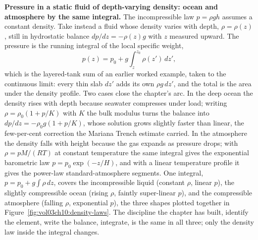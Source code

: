 \begin{mastery}
\textbf{Pressure in a static fluid of depth-varying density: ocean and
atmosphere by the same integral.} The incompressible law $p=\rho gh$
assumes a constant density. Take instead a fluid whose density varies with
depth, $\rho=\rho(z)$, still in hydrostatic balance $dp/dz=-\rho(z)g$ with
$z$ measured upward. The pressure is the running integral of the local
specific weight,
\[
p(z) = p_0 + g\int_z^{z_0}\rho(z')\,dz',
\]
which is the layered-tank sum of an earlier worked example, taken to the
continuous limit: every thin slab $dz'$ adds its own $\rho g\,dz'$, and the
total is the area under the density profile. Two cases close the chapter's
arc. In the deep ocean the density rises with depth because seawater
compresses under load; writing $\rho=\rho_0(1+p/K)$ with $K$ the bulk
modulus turns the balance into $dp/dz=-\rho_0 g(1+p/K)$, whose solution
grows slightly faster than linear, the few-per-cent correction the Mariana
Trench estimate carried. In the atmosphere the density falls with height
because the gas expands as pressure drops; with $\rho=pM/(RT)$ at constant
temperature the same integral gives the exponential barometric law
$p=p_0\exp(-z/H)$, and with a linear temperature profile it gives the
power-law standard-atmosphere segments. One integral, $p=p_0+g\int\rho\,
dz$, covers the incompressible liquid (constant $\rho$, linear $p$), the
slightly compressible ocean (rising $\rho$, faintly super-linear $p$), and
the compressible atmosphere (falling $\rho$, exponential $p$), the three
shapes plotted together in Figure~\ref{fig:vol03ch10:density-laws}. The
discipline the chapter has built, identify the element, write the balance,
integrate, is the same in all three; only the density law inside the
integral changes.
\end{mastery}



